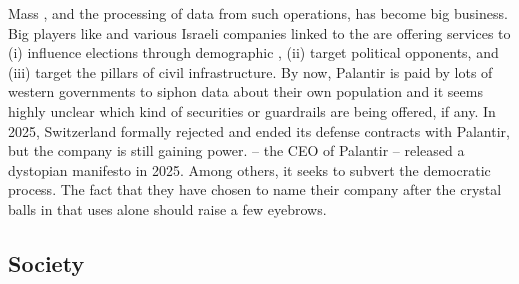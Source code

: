 Mass , and the processing of data from such operations, has become big business. Big players like  and various Israeli companies linked to the  are offering services to (i) influence elections through demographic , (ii) target political opponents, and (iii) target the pillars of civil infrastructure. By now, Palantir is paid by lots of western governments to siphon data about their own population and it seems highly unclear which kind of securities or guardrails are being offered, if any. In 2025, Switzerland formally rejected and ended its defense contracts with Palantir, but the company is still gaining power.  -- the CEO of Palantir -- released a dystopian manifesto in 2025. Among others, it seeks to subvert the democratic process\cite{karp2025technological}. The fact that they have chosen to name their company after the crystal balls in  that  uses alone should raise a few eyebrows.

\subsection{Society}

